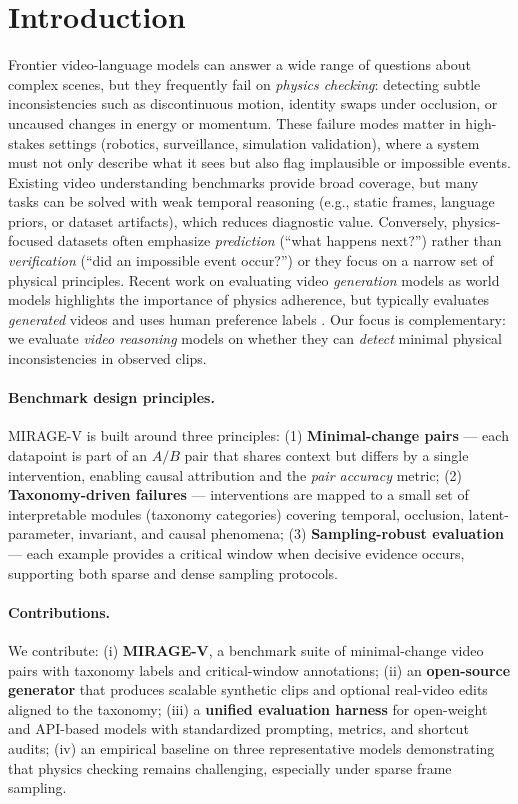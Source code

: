 \section{Introduction}
Frontier video-language models can answer a wide range of questions about complex scenes, but they frequently fail on \emph{physics checking}: detecting subtle inconsistencies such as discontinuous motion, identity swaps under occlusion, or uncaused changes in energy or momentum.
These failure modes matter in high-stakes settings (robotics, surveillance, simulation validation), where a system must not only describe what it sees but also flag implausible or impossible events. Existing video understanding benchmarks provide broad coverage, but many tasks can be solved with weak temporal reasoning (e.g., static frames, language priors, or dataset artifacts), which reduces diagnostic value.
Conversely, physics-focused datasets often emphasize \emph{prediction} (``what happens next?'') rather than \emph{verification} (``did an impossible event occur?'') or they focus on a narrow set of physical principles.
Recent work on evaluating video \emph{generation} models as world models highlights the importance of physics adherence, but typically evaluates \emph{generated} videos and uses human preference labels \cite{li2025worldmodelbench}.
Our focus is complementary: we evaluate \emph{video reasoning} models on whether they can \emph{detect} minimal physical inconsistencies in observed clips.

\paragraph{Benchmark design principles.}

MIRAGE-V is built around three principles:
(1) \textbf{Minimal-change pairs} --- each datapoint is part of an $A/B$ pair that shares context but differs by a single intervention, enabling causal attribution and the \emph{pair accuracy} metric;
(2) \textbf{Taxonomy-driven failures} --- interventions are mapped to a small set of interpretable modules (taxonomy categories) covering temporal, occlusion, latent-parameter, invariant, and causal phenomena;
(3) \textbf{Sampling-robust evaluation} --- each example provides a critical window when decisive evidence occurs, supporting both sparse and dense sampling protocols.

\paragraph{Contributions.}
We contribute:
(i) \textbf{MIRAGE-V}, a benchmark suite of minimal-change video pairs with taxonomy labels and critical-window annotations;
(ii) an \textbf{open-source generator} that produces scalable synthetic clips and optional real-video edits aligned to the taxonomy;
(iii) a \textbf{unified evaluation harness} for open-weight and API-based models with standardized prompting, metrics, and shortcut audits;
(iv) an empirical baseline on three representative models demonstrating that physics checking remains challenging, especially under sparse frame sampling.
